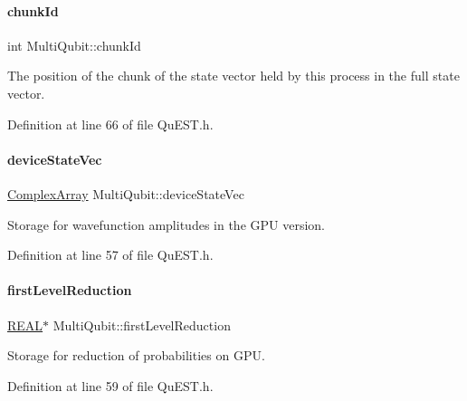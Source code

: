 \paragraph{\texorpdfstring{chunk\+Id}{chunkId}}
{\footnotesize\ttfamily int Multi\+Qubit\+::chunk\+Id}



The position of the chunk of the state vector held by this process in the full state vector. 



Definition at line 66 of file Qu\+E\+S\+T.\+h.

\mbox{\label{structMultiQubit_a59ac613486a41b8c9a4b6e79cc8d2cc3}} 
\paragraph{\texorpdfstring{device\+State\+Vec}{deviceStateVec}}
{\footnotesize\ttfamily \mbox{\hyperlink{structComplexArray}{Complex\+Array}} Multi\+Qubit\+::device\+State\+Vec}



Storage for wavefunction amplitudes in the G\+PU version. 



Definition at line 57 of file Qu\+E\+S\+T.\+h.

\mbox{\label{structMultiQubit_a4e0088b41adab0a40b7a31e528ed42b5}} 
\paragraph{\texorpdfstring{first\+Level\+Reduction}{firstLevelReduction}}
{\footnotesize\ttfamily \mbox{\hyperlink{QuEST__precision_8h_a4b654506f18b8bfd61ad2a29a7e38c25}{R\+E\+AL}}$\ast$ Multi\+Qubit\+::first\+Level\+Reduction}



Storage for reduction of probabilities on G\+PU. 



Definition at line 59 of file Qu\+E\+S\+T.\+h.

\mbox{\label{structMultiQubit_a04c9f5254af58e4c4a54712eb32e7082}} 
